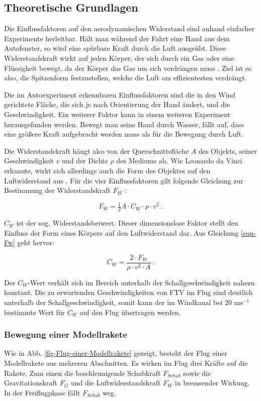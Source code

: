 \documentclass[10pt,a4paper]{article}
\begin{document}
\subsection{Theoretische Grundlagen}

Die Einflussfaktoren auf den aerodynamischen Widerstand sind anhand einfacher Experimente herleitbar. Hält man während der Fahrt eine Hand aus dem Autofenster, so wird eine spürbare Kraft durch die Luft ausgeübt. Diese Widerstandskraft wirkt auf jeden Körper, der sich durch ein Gas oder eine Flüssigkeit bewegt, da der Körper das Gas um sich verdrängen muss \cite{dlr,lp}. Ziel ist es also, die Spitzenform festzustellen, welche die Luft am effizientesten verdrängt.

Die im Autoexperiment erkennbaren Einflussfaktoren sind die in den Wind gerichtete Fläche, die sich je nach Orientierung der Hand ändert, und die Geschwindigkeit. Ein weiterer Faktor kann in einem weiteren Experiment herausgefunden werden. Bewegt man seine Hand durch Wasser, fällt auf, dass eine größere Kraft aufgebracht werden muss als für die Bewegung durch Luft.

Die Widerstandskraft hängt also von der Querschnittsfläche $A$ des Objekts, seiner Geschwindigkeit $v$ und der Dichte $\rho$ des Mediums ab. Wie Leonardo da Vinci erkannte, wirkt sich allerdings auch die Form des Objektes auf den Luftwiderstand aus \cite{hw}.
Für die vier Einflussfaktoren gilt folgende Gleichung zur Bestimmung der Widerstandskraft $F_{W}$ \cite{lp}:

\begin{equation}
F_{W}=\tfrac{1}{2} A \cdot C_{W} \cdot \rho \cdot v^2
\label{equ-Fw} \ .
\end{equation} 

\noindent
$C_{W}$ ist der sog. Widerstandsbeiwert. Dieser dimensionslose Faktor stellt den Einfluss der Form eines Körpers auf den Luftwiderstand dar. Aus Gleichung \eqref{equ-Fw} geht hervor:

$$ C_{W}=\frac{2 \cdot F_{W}}{\rho \cdot v^2 \cdot A} \ . $$

\noindent
Der $C_{W}$-Wert verhält sich im Bereich unterhalb der Schallgeschwindigkeit nahezu konstant. Die zu erwartenden Geschwindigkeiten von FTV im Flug sind deutlich unterhalb der Schallgeschwindigkeit, somit kann der im Windkanal bei $20 \text{ ms}^{-1}$ bestimmte Wert für $C_{W}$ auf den Flug übertragen werden.


\subsubsection{Bewegung einer Modellrakete} 
Wie in Abb. \ref{fig-Flug-einer-Modellrakete} gezeigt, besteht der Flug einer Modellrakete aus mehreren Abschnitten. Es wirken im Flug drei Kräfte auf die Rakete. Zum einen die beschleunigende Schubkraft $F_{Schub}$ sowie die Gravitationskraft $F_{G}$ und die Luftwiderstandskraft $F_{W}$ in bremsender Wirkung. In der Freiflugphase fällt $F_{Schub}$ weg.
\end{document}
